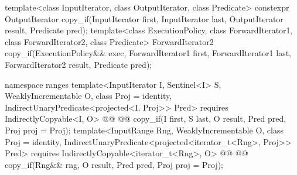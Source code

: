 %
\begin{itemdecl}
template<class InputIterator, class OutputIterator, class Predicate>
  constexpr OutputIterator copy_if(InputIterator first, InputIterator last,
                                   OutputIterator result, Predicate pred);
template<class ExecutionPolicy, class ForwardIterator1, class ForwardIterator2,
         class Predicate>
  ForwardIterator2 copy_if(ExecutionPolicy&& exec,
                           ForwardIterator1 first, ForwardIterator1 last,
                           ForwardIterator2 result, Predicate pred);
\end{itemdecl}
\begin{addedblock}\begin{itemdecl}
namespace ranges {
  template<InputIterator I, Sentinel<I> S, WeaklyIncrementable O, class Proj = identity,
      IndirectUnaryPredicate<projected<I, Proj>> Pred>
    requires IndirectlyCopyable<I, O>
    @@
    @@
      copy_if(I first, S last, O result, Pred pred, Proj proj = Proj{});
  template<InputRange Rng, WeaklyIncrementable O, class Proj = identity,
      IndirectUnaryPredicate<projected<iterator_t<Rng>, Proj>> Pred>
    requires IndirectlyCopyable<iterator_t<Rng>, O>
    @@
    @@
      copy_if(Rng&& rng, O result, Pred pred, Proj proj = Proj{});
}
\end{itemdecl}\end{addedblock}

